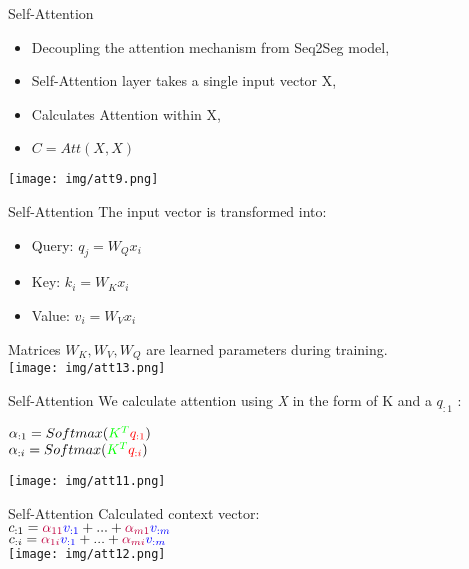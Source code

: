 \documentclass{beamer}
\begin{document}
\begin{frame}{Self-Attention}
\begin{itemize}
\item Decoupling the attention mechanism from Seq2Seg model,
\item Self-Attention layer takes a single input vector X,
\item Calculates Attention within X,
\item $C=Att(X,X)$ 
\end{itemize}
\texttt{[image: img/att9.png]} 
\end{frame}

\begin{frame}{Self-Attention}
The input vector is transformed into:
\begin{itemize}
\item \color{red}Query: \color{black} $q_j=W_Q x_i$
\item \color{green}Key: \color{black} $k_i=W_K x_i$
\item \color{blue}Value: \color{black} $v_i=W_V x_i$
\end{itemize}
Matrices $W_K, W_V, W_Q$ are learned parameters during training.\\
\texttt{[image: img/att13.png]} 
\end{frame} 

\begin{frame}{Self-Attention}
We calculate attention using \textit{X} in the form of \color{green}K \color{black} and a \color{red}$q_{:1}$ \color{black}: \\
\begin{center}
$\alpha_{:1}=Softmax(\color{green}K^T \color{red}q_{:1} \color{black})$\\
$\alpha_{:i}=Softmax(\color{green}K^T \color{red}q_{:i} \color{black})$\\
\end{center}
\texttt{[image: img/att11.png]} 
\end{frame}

\begin{frame}{Self-Attention}
Calculated context vector:\\
$c_{:1}=\color{purple}\alpha_{11} \color{blue}v_{:1} \color{black}+...+\color{purple}\alpha_{m1} \color{blue} v_{:m}$\\
$c_{:i}=\color{purple}\alpha_{1i} \color{blue}v_{:1} \color{black}+...+\color{purple}\alpha_{mi} \color{blue} v_{:m}$\\
\texttt{[image: img/att12.png]} 
\end{frame}
\end{document}
